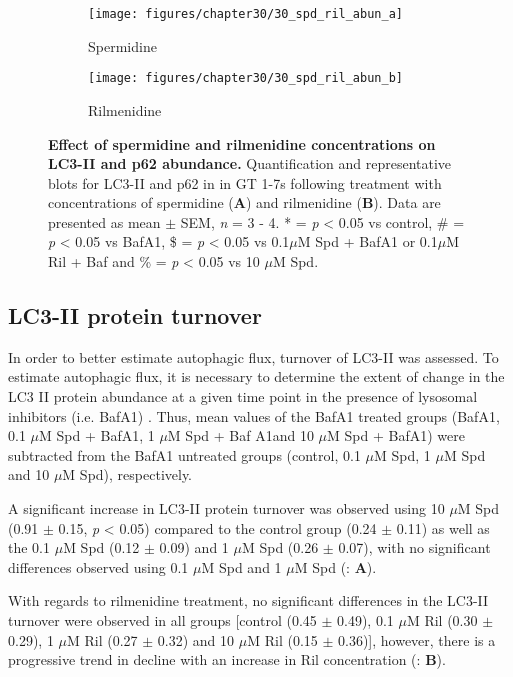 \begin{landscape}
\begin{figure}[!htbp]
  \centering
  \begin{subfigure}[b]{0.35\linewidth}
    \texttt{[image: figures/chapter30/30\_spd\_ril\_abun\_a]}
    \caption{Spermidine}
  \end{subfigure}
  \begin{subfigure}[b]{0.35\linewidth}
    \texttt{[image: figures/chapter30/30\_spd\_ril\_abun\_b]}
    \caption{Rilmenidine}
  \end{subfigure}
  \caption[Effect of spermidine and rilmenidine concentrations on LC3-II and p62 abundance]{\textbf{Effect of spermidine and rilmenidine concentrations on LC3-II and p62 abundance.} Quantification and representative blots for LC3-II and p62 in in GT 1-7s following treatment with concentrations of spermidine (\textbf{A}) and rilmenidine (\textbf{B}). Data are presented as mean $\pm$ SEM, \textit{n} = 3 - 4. * = \textit{p} < 0.05 vs control, \# = \textit{p} < 0.05 vs BafA1, \$ = \textit{p} < 0.05 vs 0.1$\mu$M Spd + BafA1 or 0.1$\mu$M Ril + Baf and \% = \textit{p} < 0.05 vs 10 $\mu$M Spd.}
  \label{fig:30_spd_ril_abun_a}
\end{figure}
\end{landscape}

\subsection{LC3-II protein turnover}
In order to better estimate autophagic flux, turnover of LC3-II was assessed. To estimate autophagic flux, it is necessary to determine the extent of change in the LC3 II protein abundance at a given time point in the presence of lysosomal inhibitors (i.e. BafA1) \citep{Martinez-Lopez2013}. Thus, mean values of the BafA1 treated groups (BafA1, 0.1 $\mu$M Spd + BafA1, 1 $\mu$M Spd + Baf A1and 10 $\mu$M Spd + BafA1) were subtracted from the BafA1 untreated groups (control, 0.1 $\mu$M Spd, 1 $\mu$M Spd and 10 $\mu$M Spd), respectively.

A significant increase in LC3-II protein turnover was observed using 10 $\mu$M Spd (0.91 $\pm$ 0.15, \textit{p} < 0.05) compared to the control group (0.24 $\pm$ 0.11) as well as the 0.1 $\mu$M Spd (0.12 $\pm$ 0.09) and 1 $\mu$M Spd (0.26 $\pm$ 0.07), with no significant differences observed using 0.1 $\mu$M Spd  and 1 $\mu$M Spd (: \textbf{A}). 

With regards to rilmenidine treatment, no significant differences in the LC3-II turnover were observed in all groups [control (0.45 $\pm$ 0.49), 0.1 $\mu$M Ril (0.30 $\pm$ 0.29), 1 $\mu$M Ril (0.27 $\pm$ 0.32) and 10 $\mu$M Ril (0.15 $\pm$ 0.36)], however, there is a progressive trend in decline with an increase in Ril concentration (: \textbf{B}). 

